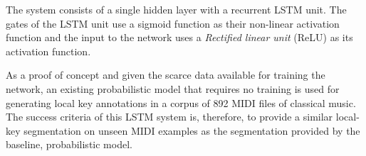 The system consists of a single hidden layer with a
recurrent LSTM unit. The gates of the LSTM unit use a
sigmoid function as their non-linear activation function and
the input to the network uses a \emph{Rectified linear unit}
(ReLU) as its activation function.

As a proof of concept and given the scarce data available
for training the network, an existing probabilistic model
that requires no training \cite{napoleslopez2019keyfinding}
is used for generating local key annotations in a corpus of
892 MIDI files of classical music. The success criteria of
this LSTM system is, therefore, to provide a similar
local-key segmentation on unseen MIDI examples as the
segmentation provided by the baseline, probabilistic model.
